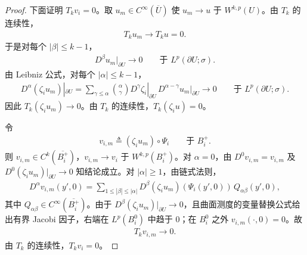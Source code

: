 \documentclass[../../main.tex]{subfiles}%
\begin{document}
\begin{proof}
下面证明 $T_{k}v_{i}=0$。取 $u_{m}\in C^{\infty}(\overline{U})$ 使 $u_{m}\to u$ 于 $W^{k,p}(U)$。由 $T_{k}$ 的连续性，
\begin{align*}
T_{k}u_{m}\longrightarrow T_{k}u=0.
\end{align*}
于是对每个 $|\beta|\leqslant k-1$，
\begin{align*}
D^{\beta}u_{m}|_{\partial U}\longrightarrow0
\qquad\text{于 }L^{p}(\partial U;\sigma).
\end{align*}
由 Leibniz 公式，对每个 $|\alpha|\leqslant k-1$，
\begin{align*}
D^{\alpha}(\zeta_{i}u_{m})|_{\partial U}
=\sum_{\gamma\leqslant\alpha}
\binom{\alpha}{\gamma}
D^{\gamma}\zeta_{i}|_{\partial U}\,
D^{\alpha-\gamma}u_{m}|_{\partial U}
\longrightarrow0
\qquad\text{于 }L^{p}(\partial U;\sigma).
\end{align*}
因此 $T_{k}(\zeta_{i}u_{m})\to0$。由 $T_{k}$ 的连续性，$T_{k}(\zeta_{i}u)=0$。

令
\begin{align*}
v_{i,m}\triangleq(\zeta_{i}u_{m})\circ\Psi_{i}
\qquad\text{于 }B_{i}^{+}.
\end{align*}
则 $v_{i,m}\in C^{k}(\overline{B_{i}^{+}})$，$v_{i,m}\to v_{i}$ 于 $W^{k,p}(B_{i}^{+})$。对 $\alpha=0$，由 $D^{0}v_{i,m}=v_{i,m}$ 及 $D^{0}(\zeta_{i}u_{m})|_{\partial U}\to0$ 知结论成立。对 $|\alpha|\geqslant1$，由链式法则，
\begin{align*}
D^{\alpha}v_{i,m}(y',0)
=
\sum_{1\leqslant|\beta|\leqslant|\alpha|}
D^{\beta}(\zeta_{i}u_{m})(\Psi_{i}(y',0))\,
Q_{\alpha\beta}(y',0),
\end{align*}
其中 $Q_{\alpha\beta}\in C^{\infty}(\overline{B_{i}^{+}})$。由于 $D^{\beta}(\zeta_{i}u_{m})|_{\partial U}\to0$，且曲面测度的变量替换公式给出有界 Jacobi 因子，右端在 $L^{p}(B_{i}^{0})$ 中趋于 $0$；在 $B_{i}^{0}$ 之外 $v_{i,m}(\cdot,0)=0$。故
\begin{align*}
T_{k}v_{i,m}\longrightarrow0.
\end{align*}
由 $T_{k}$ 的连续性，$T_{k}v_{i}=0$。


\end{proof}
\end{document}
